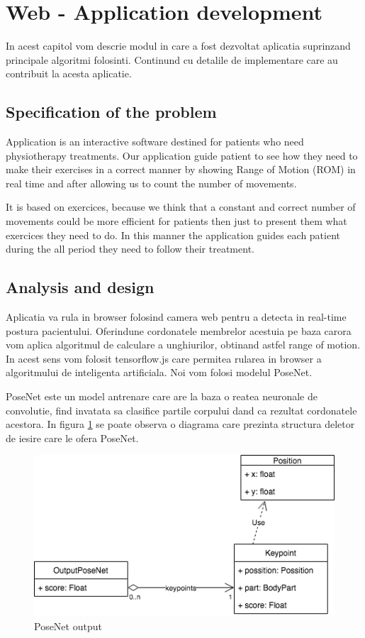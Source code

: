 \section{Web - Application development}

In acest capitol vom descrie modul in care a fost dezvoltat aplicatia suprinzand principale algoritmi folosinti. 
Continund cu  detalile de implementare care au contribuit la acesta aplicatie.



\subsection{Specification of the problem}

Application is an interactive software destined for patients who need physiotherapy
treatments. Our application guide patient to see how they need to make their exercises in 
a correct manner by showing Range of Motion (ROM) in real time and after allowing us to 
 count the number of movements. 
 
It is based on exercices, because we think that a constant and correct number of movements could be more efficient for patients then just to present them what exercices they need to do. In this manner the application guides each patient during the all period they need to follow their treatment. 


\subsection{Analysis and design}

Aplicatia va rula in browser folosind camera web pentru a detecta in real-time postura pacientului.
Oferindune cordonatele membrelor acestuia pe baza carora vom aplica algoritmul de calculare a unghiurilor, obtinand astfel range of motion. 
In acest sens vom folosit tensorflow.js care permitea rularea in browser a algoritmului de inteligenta artificiala.
Noi vom folosi modelul PoseNet.

PoseNet este un model antrenare care are la baza o reatea neuronale de convolutie, find invatata sa clasifice partile corpului dand ca rezultat cordonatele acestora. In figura \ref{fig:uml-posenet} se poate observa o diagrama care prezinta structura deletor de iesire care le ofera PoseNet.

 \begin{figure}[htbp]
	\centerline{\includegraphics[scale=0.7]{fig/uml-posenet.png}}  
	\caption{PoseNet output}
	\label{fig:uml-posenet}
\end{figure}

